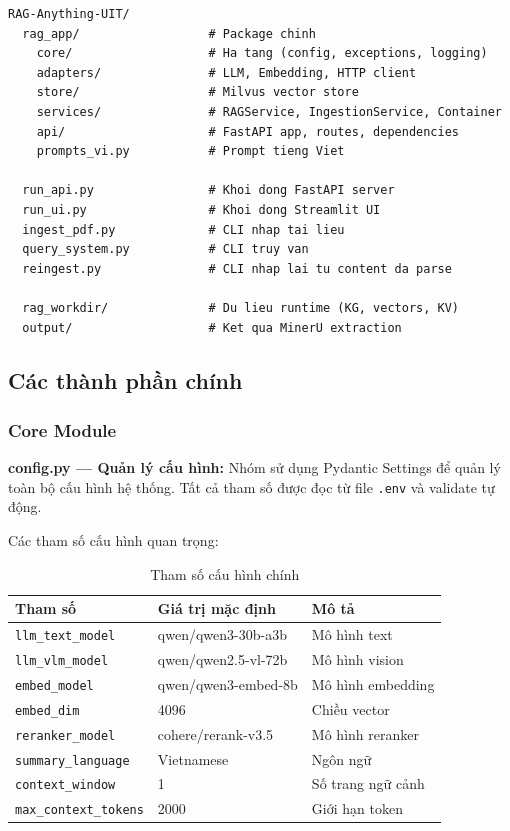 \documentclass[12pt,a4paper]{article}
\begin{document}
\begin{lstlisting}[language=pseudo,caption={Cấu trúc thư mục}]
RAG-Anything-UIT/
  rag_app/                  # Package chinh
    core/                   # Ha tang (config, exceptions, logging)
    adapters/               # LLM, Embedding, HTTP client
    store/                  # Milvus vector store
    services/               # RAGService, IngestionService, Container
    api/                    # FastAPI app, routes, dependencies
    prompts_vi.py           # Prompt tieng Viet

  run_api.py                # Khoi dong FastAPI server
  run_ui.py                 # Khoi dong Streamlit UI
  ingest_pdf.py             # CLI nhap tai lieu
  query_system.py           # CLI truy van
  reingest.py               # CLI nhap lai tu content da parse

  rag_workdir/              # Du lieu runtime (KG, vectors, KV)
  output/                   # Ket qua MinerU extraction
\end{lstlisting}

\subsection{Các thành phần chính}

\subsubsection{Core Module}

\textbf{config.py --- Quản lý cấu hình:} Nhóm sử dụng Pydantic Settings để quản lý toàn bộ cấu hình hệ thống. Tất cả tham số được đọc từ file \texttt{.env} và validate tự động.

Các tham số cấu hình quan trọng:

\begin{table}[H]
\centering
\caption{Tham số cấu hình chính}
\begin{tabular}{p{4.5cm}p{4cm}p{4.5cm}}
\toprule
\textbf{Tham số} & \textbf{Giá trị mặc định} & \textbf{Mô tả} \\
\midrule
\texttt{llm\_text\_model} & qwen/qwen3-30b-a3b & Mô hình text \\
\texttt{llm\_vlm\_model} & qwen/qwen2.5-vl-72b & Mô hình vision \\
\texttt{embed\_model} & qwen/qwen3-embed-8b & Mô hình embedding \\
\texttt{embed\_dim} & 4096 & Chiều vector \\
\texttt{reranker\_model} & cohere/rerank-v3.5 & Mô hình reranker \\
\texttt{summary\_language} & Vietnamese & Ngôn ngữ \\
\texttt{context\_window} & 1 & Số trang ngữ cảnh \\
\texttt{max\_context\_tokens} & 2000 & Giới hạn token \\
\bottomrule
\end{tabular}
\end{table}
\end{document}
